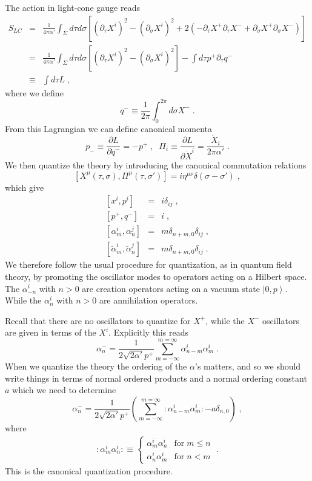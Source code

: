 \documentclass[11pt,a4paper]{article}
\numberwithin{equation}{section}
\numberwithin{table}{section}\setlength{\multlinegap}{25pt}
\newcommand{\bea}{\begin{eqnarray}}  \newcommand{\eea}{\end{eqnarray}}
\newcommand{\nn}{\nonumber}
\newcommand{\be}{\begin{equation}}
\newcommand{\ee}{\end{equation}}
\begin{document}
The action in light-cone gauge reads
\bea
S_{LC} &=& \frac{1}{4\pi\alpha'} \int_{\Sigma} d\tau d\sigma \left[ \left(\partial_{\tau} X^i \right)^2 - \left(\partial_{\sigma} X^i \right)^2 + 2\left( - \partial_{\tau} X^+ \partial_\tau X^- + \partial_{\sigma} X^+ \partial_{\sigma} X^- \right)\right] \nn \\
&=& \frac{1}{4\pi\alpha'} \int_{\Sigma} d\tau d\sigma \left[ \left(\partial_{\tau} X^i \right)^2 - \left(\partial_{\sigma} X^i \right)^2 \right] - \int d\tau p^+ \partial_{\tau} q^- \nn \\
&\equiv& \int d\tau L \;,
\eea
where we define
\be
q^- \equiv \frac{1}{2\pi} \int_0^{2\pi} d \sigma X^- \;.
\ee
From this Lagrangian we can define canonical momenta
\be
p_- \equiv \frac{\partial L}{\partial \dot q^-} = - p^+ \;,\;\; \Pi_i \equiv \frac{\partial L}{\partial \dot X^i}  = \frac{\dot X_i}{2 \pi \alpha'} \;.
\ee
We then quantize the theory by introducing the canonical commutation relations
\be
\left[ X^{\mu}\left(\tau,\sigma\right),\Pi^{\mu}\left(\tau,\sigma'\right)\right] = i \eta^{\mu\nu} \delta\left(\sigma -\sigma' \right) \;,
\ee
which give
\bea
\left[x^i,p^i \right] &=& i \delta_{ij} \;, \nn \\
\left[ p^+,q^-\right] &=& i \;, \nn \\
\left[\alpha_m^i,\alpha_n^j \right] &=& m \delta_{n+m,0}\delta_{ij} \;, \nn \\
\left[\tilde{\alpha}_m^i,\tilde{\alpha}_n^j \right] &=& m \delta_{n+m,0}\delta_{ij} \;.
\eea
We therefore follow the usual procedure for quantization, as in quantum field theory, by promoting the oscillator modes to operators acting on a Hilbert space. The $\alpha^i_{-n}$ with $n>0$ are creation operators acting on a vacuum state $\left|0,p\right>$. While the $\alpha^i_{n}$ with $n>0$ are annihilation operators.

Recall that there are no oscillators to quantize for $X^+$, while the $X^-$ oscillators are given in terms of the $X^i$. Explicitly this reads
\be
\alpha^-_n = \frac{1}{2\sqrt{2 \alpha'}p^+} \sum_{m=-\infty}^{m=\infty} \alpha^i_{n-m}\alpha^i_m \;.
\label{lcosc}
\ee
When we quantize the theory the ordering of the $\alpha$'s matters, and so we should write things in terms of normal ordered products and a normal ordering constant $a$ which we need to determine
\be
\alpha^-_n = \frac{1}{2\sqrt{2 \alpha'}p^+} \left( \sum_{m=-\infty}^{m=\infty}: \alpha^i_{n-m}\alpha^i_m: - a \delta_{n,0}\right) \;,
\ee
where
\bea
: \alpha^i_{m}\alpha^i_n:  \equiv \left\{ \begin{array}{cc} \alpha^i_{m}\alpha^i_n & \mathrm{for\;} m \leq n \\ \alpha^i_{n}\alpha^i_m & \mathrm{for\;} n < m \end{array} \right. \;.
\eea
This is the canonical quantization procedure. 
\end{document}
